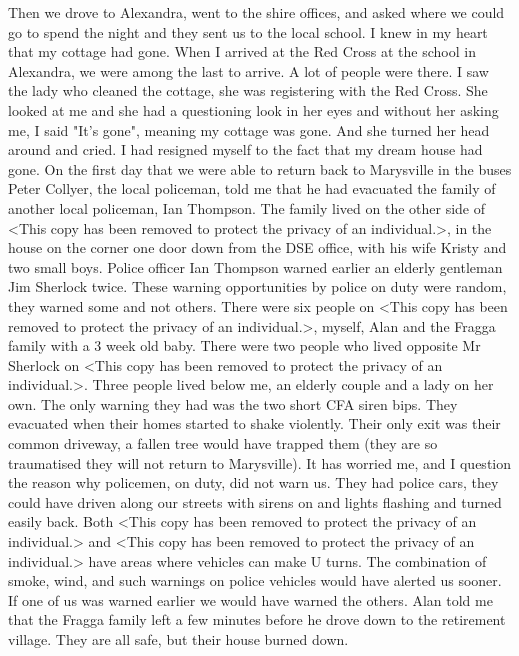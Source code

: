 \documentclass[a4paper]{article}
\begin{document}
    Then we drove to Alexandra, went to the shire offices, and asked where we could go to spend the night and they sent us to the local school.
    I knew in my heart that my cottage had gone. When I arrived at the Red Cross at the school in Alexandra, we were among the last to arrive. A lot of people were there. I saw the lady who cleaned the cottage, she was registering with the Red Cross. She looked at me and she had a questioning look in her eyes and without her asking me, I said "It's gone", meaning my cottage was gone. And she turned her head around and cried. I had resigned myself to the fact that my dream house had gone.
    On the first day that we were able to return back to Marysville in the buses Peter Collyer, the local policeman, told me that he had evacuated the family of another local policeman, Ian Thompson. The family lived on the other side of <This copy has been removed to protect the privacy of an individual.>, in the house on the corner one door down from the DSE office, with his wife Kristy and two small boys. Police officer Ian Thompson warned earlier an elderly gentleman Jim Sherlock twice. These warning opportunities by police on duty were random, they warned some and not others. There were six people on <This copy has been removed to protect the privacy of an individual.>, myself, Alan and the Fragga family with a 3 week old baby. There were two people who lived opposite Mr Sherlock on <This copy has been removed to protect the privacy of an individual.>. Three people lived below me, an elderly couple and a lady on her own. The only warning they had was the two short CFA siren bips. They evacuated when their homes started to shake violently. Their only exit was their common driveway, a fallen tree would have trapped them (they are so traumatised they will not return to Marysville). It has worried me, and I question the reason why policemen, on duty, did not warn us. They had police cars, they could have driven along our streets with sirens on and lights flashing and turned easily back. Both <This copy has been removed to protect the privacy of an individual.> and <This copy has been removed to protect the privacy of an individual.> have areas where vehicles can make U turns. The combination of smoke, wind, and such warnings on police vehicles would have alerted us sooner. If one of us was warned earlier we would have warned the others.
    Alan told me that the Fragga family left a few minutes before he drove down to the retirement village. They are all safe, but their house burned down.
\end{document}
